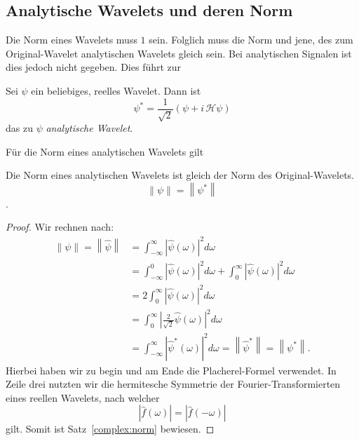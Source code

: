 \subsection{Analytische Wavelets und deren Norm}

Die Norm eines Wavelets muss $1$ sein.
Folglich muss die Norm und jene, des zum Original-Wavelet analytischen Wavelets gleich sein.
Bei analytischen Signalen ist dies jedoch nicht gegeben.
Dies führt zur
\begin{definition}
	Sei $\psi$ ein beliebiges, reelles Wavelet. Dann ist
	\[
	\psi^\ast = \frac{1}{\sqrt{2}}\left(\psi + i\,\mathcal{H}\psi\right) 
	\]
	das zu $\psi$ \emph{analytische Wavelet}.
\end{definition}

Für die Norm eines analytischen Wavelets gilt
\begin{satz}
	\label{complex:norm}
	Die Norm eines analytischen Wavelets ist gleich der Norm des Original-Wavelets.
	\[\left\|\psi\right\| = \left\|\psi^\ast\right\|\].
\end{satz}

\begin{proof}
	Wir rechnen nach:
	\begin{align*}
		\left\|\psi\right\| = \left\|\hat{\psi}\right\|
		&= \int_{-\infty}^{\infty}\left|\hat{\psi}(\omega)\right|^2 d\omega \\
		&= \int_{-\infty}^{0}\left|\hat{\psi}(\omega)\right|^2 d\omega +  \int_{0}^{\infty}\left|\hat{\psi}(\omega)\right|^2 d\omega \\
		&=  2\int_{0}^{\infty}\left|\hat{\psi}(\omega)\right|^2 d\omega \\
		&=  \int_{0}^{\infty}\left|\frac{2}{\sqrt{2}}\hat{\psi}(\omega)\right|^2 d\omega \\
		&=  \int_{-\infty}^{\infty}\left|\hat{\psi}^\ast(\omega)\right|^2 d\omega 
		= \left\|\hat{\psi}^\ast\right\| = \left\|\psi^\ast\right\|.
	\end{align*}
	Hierbei haben wir zu begin und am Ende die Placherel-Formel verwendet.
	In Zeile drei nutzten wir die hermitesche Symmetrie der Fourier-Transformierten eines reellen Wavelets, nach welcher
	\[\left|\hat{f}(\omega)\right| = \left|\hat{f}(-\omega)\right|\]
	gilt.
	Somit ist Satz~\ref{complex:norm} bewiesen.
\end{proof}
